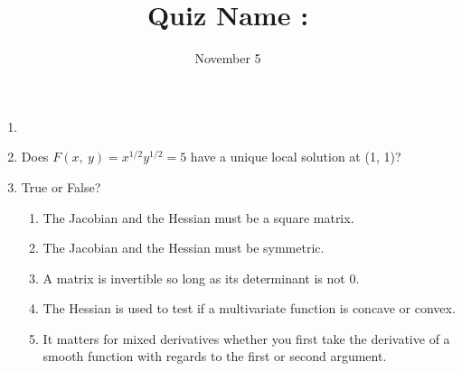 \documentclass[11pt]{article}
\begin{document}
\title{Quiz \hfill Name : \underline{\hspace{3cm}}}
\date{November 5}
\maketitle
\begin{enumerate}
\item 
\item[] Does $F(x,\ y)=x^{1/2}y^{1/2}=5$ have a unique local solution at (1, 1)?

\item True or False?

\begin{enumerate}
\item The Jacobian and the Hessian must be a square matrix.
\item The Jacobian and the Hessian must be symmetric.
\item A matrix is invertible so long as its determinant is not 0.
\item The Hessian is used to test if a multivariate function is concave or convex.
\item It matters for mixed derivatives whether you first take the derivative of a smooth function with regards to the first or second argument.
\end{enumerate}


\end{enumerate}
\end{document}
